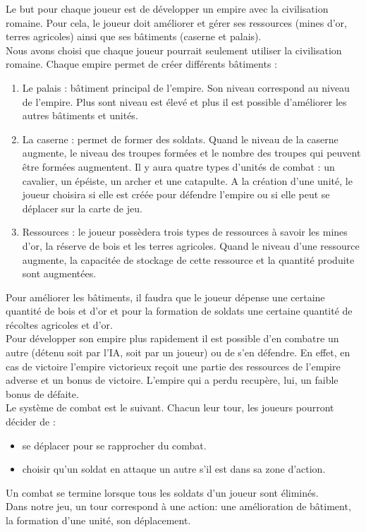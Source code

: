 \documentclass[12pt,a4paper]{article}
\begin{document}
Le but pour chaque joueur est de développer un empire avec la civilisation romaine. Pour cela, le joueur doit améliorer et gérer ses ressources (mines d'or, terres agricoles) ainsi que ses bâtiments (caserne et palais). \\
Nous avons choisi que chaque joueur pourrait seulement utiliser la civilisation romaine. Chaque empire permet de créer différents bâtiments : 
\begin{enumerate}
    \item Le palais : bâtiment principal de l'empire. Son niveau correspond au niveau de l'empire. Plus sont niveau est élevé et plus il est possible d'améliorer les autres bâtiments et unités.
    \item La caserne : permet de former des soldats. Quand le niveau de la caserne augmente, le niveau des troupes formées et le nombre des troupes qui peuvent être formées augmentent. Il y aura quatre types d'unités de combat : un cavalier, un épéiste, un archer et une catapulte. A la création d'une unité, le joueur choisira si elle est créée pour défendre l'empire ou si elle peut se déplacer sur la carte de jeu.
    \item Ressources : le joueur possèdera trois types de ressources à savoir les mines d'or, la réserve de bois et les terres agricoles. Quand le niveau d'une ressource augmente, la capacitée de stockage de cette ressource et la quantité produite sont augmentées.
\end{enumerate}
Pour améliorer les bâtiments, il faudra que le joueur dépense une certaine quantité de bois et d'or et pour la formation de soldats une certaine quantité de récoltes agricoles et d'or.\\
Pour développer son empire plus rapidement il est possible d'en combatre un autre (détenu soit par l'IA, soit par un joueur) ou de s'en défendre. En effet, en cas de victoire l'empire victorieux reçoit une partie des ressources de l'empire adverse et un bonus de victoire. L'empire qui a perdu recupère, lui, un faible bonus de défaite. \\Le système de combat est le suivant. 
Chacun leur tour, les joueurs pourront décider de : 
\begin{itemize}
    \item se déplacer pour se rapprocher du combat.
    \item choisir qu'un soldat en attaque un autre s'il est dans sa zone d'action.
\end{itemize}
Un combat se termine lorsque tous les soldats d'un joueur sont éliminés. 
\\Dans notre jeu, un tour correspond à une action: une amélioration de bâtiment, la formation d'une unité, son déplacement.\\
\end{document}

